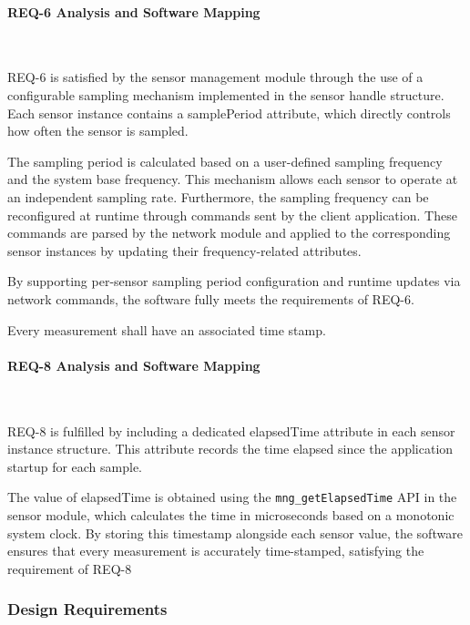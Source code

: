 \paragraph{REQ-6 Analysis and Software Mapping}\

REQ-6 is satisfied by the sensor management module through the use of a configurable 
sampling mechanism implemented in the sensor handle structure. Each sensor instance 
contains a samplePeriod attribute, which directly controls how often the sensor is 
sampled.

The sampling period is calculated based on a user-defined sampling frequency and 
the system base frequency. This mechanism allows each sensor to operate at an 
independent sampling rate. Furthermore, the sampling frequency can be reconfigured 
at runtime through commands sent by the client application. These commands are 
parsed by the network module and applied to the corresponding sensor instances by 
updating their frequency-related attributes.

By supporting per-sensor sampling period configuration and runtime updates via 
network commands, the software fully meets the requirements of REQ-6.

\begin{tcolorbox}[
    title=REQ-8,
    colback=gray!5,
    colframe=black,
    fonttitle=\bfseries
]
Every measurement shall have an associated time stamp.
\end{tcolorbox}

\paragraph{REQ-8 Analysis and Software Mapping}\

REQ-8 is fulfilled by including a dedicated elapsedTime attribute in each 
sensor instance structure. This attribute records the time elapsed since the 
application startup for each sample.

The value of elapsedTime is obtained using the \texttt{mng\_getElapsedTime}  API in the sensor 
module, which calculates the time in microseconds based on a monotonic system clock. 
By storing this timestamp alongside each sensor value, the software ensures that 
every measurement is accurately time-stamped, satisfying the requirement of REQ-8


\subsubsection{Design Requirements}


